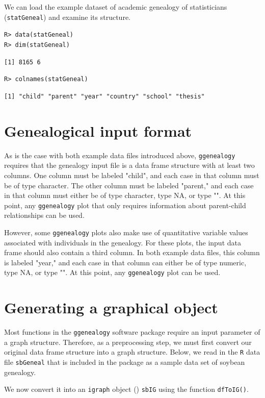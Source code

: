 \documentclass[11pt,a4paper,oldfontcommands,openany]{memoir}
\DeclareRobustCommand{\mybox}[2][gray!15]{%
\begin{tcolorbox}[   %
        breakable,
        left=0pt,
        right=0pt,
        top=0pt,
        bottom=0pt,
        colback=#1,
        colframe=#1,
        width=\dimexpr\textwidth\relax, 
        enlarge left by=0mm,
        boxsep=5pt,
        arc=0pt,outer arc=0pt,
        ]
        #2
\end{tcolorbox}
}
\numberwithin{equation}{section} %
\newcommand{\code}[1]{{\texttt{#1}}}
\newcommand{\pkg}[1]{{\texttt{#1}}}
\begin{document}
We can load the example dataset of academic genealogy of statisticians (\code{statGeneal}) and examine its structure. 

\mybox{
\texttt{R> data(statGeneal)}\\
\texttt{R> dim(statGeneal)}
}

\mybox[green!10]{
\texttt{[1] 8165    6}
}

\mybox{
\texttt{R> colnames(statGeneal)}
}

\mybox[green!10]{
\texttt{[1] "child"   "parent"  "year"    "country" "school"  "thesis"}
}

\section{Genealogical input format}

As is the case with both example data files introduced above, \pkg{ggenealogy} requires that the genealogy input file is a data frame structure with at least two columns. One column must be labeled "child", and each case in that column must be of type character. The other column must be labeled "parent," and each case in that column must either be of type character, type NA, or type "". At this point, any \pkg{ggenealogy} plot that only requires information about parent-child relationships can be used.

However, some \pkg{ggenealogy} plots also make use of quantitative variable values associated with individuals in the genealogy. For these plots, the input data frame should also contain a third column. In both example data files, this column is labeled "year," and each case in that column can either be of type numeric, type NA, or type "". At this point, any \pkg{ggenealogy} plot can be used.

\section{Generating a graphical object}

Most functions in the \pkg{ggenealogy} software package require an input parameter of a graph structure. Therefore, as a preprocessing step, we must first convert our original data frame structure into a graph structure. Below, we read in the \pkg{R} data file \code{sbGeneal} that is included in the package as a sample data set of soybean genealogy.

We now convert it into an \pkg{igraph} object (\citealt{igraph}) \code{sbIG} using the function \code{dfToIG()}.
\end{document}
